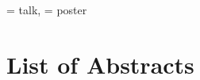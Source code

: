 \documentclass[
	openany, %
	parskip=false, %
	12pt, %
	a4paper, %
]{conferencebooklet} %
\begin{document}
\vspace{5em}

\TLtag = talk, \POtag = poster

%
%


\chapter{List of Abstracts}
\end{document}
